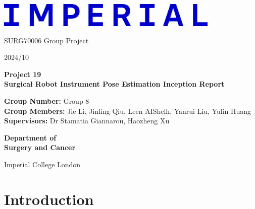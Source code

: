 \documentclass[12pt]{article}
\begin{document}
\begin{titlepage}
      \centering

      \includegraphics[width=0.8\textwidth]{Imperial_College_London_new_logo.png} %
      \vspace*{1cm}

      \Large
      SURG70006 Group Project

      \large
      2024/10

      \vspace{0.5cm}
      \Huge
      \textbf{Project 19 \\ Surgical Robot Instrument Pose Estimation Inception Report}

      \vspace{1.3cm}


      \begin{mdframed}
            \normalsize %
            \textbf{Group Number:} Group 8\\[20pt] %
            \textbf{Group Members:} Jie Li, Jinling Qiu, Leen AIShelh, Yanrui Liu, Yulin Huang\\[20pt] %
            \textbf{Supervisors:} Dr Stamatia Giannarou, Haozheng Xu %
      \end{mdframed}

      \vspace{2cm} %
      \Large
      \textbf{Department of}\\
      \vspace{0.1cm} %
      \textbf{Surgery and Cancer}

      \vspace{3.6cm} %
      \Large
      Imperial College London\\
      


\end{titlepage}

\newpage
\tableofcontents

\newpage

\section{Introduction}
\end{document}
